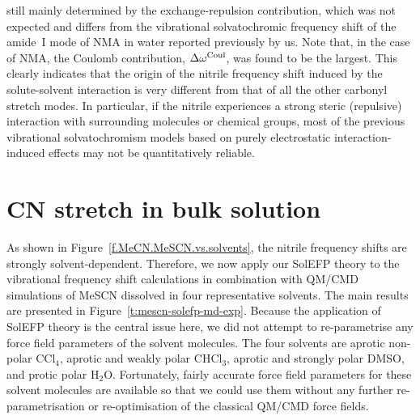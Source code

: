 \documentclass[a4paper,titlepage,twoside,fleqn,12pt]{book}
\begin{document}
\begin{refsection}
still mainly determined by the exchange\hyp{}repulsion
contribution, which was not expected and differs from the
vibrational solvatochromic frequency shift of the amide~I mode
of NMA in water reported previously by us. \citep{Blasiak.Cho.JCP.2014,Blasiak.Cho.JCP.2015} 
Note that, in
the case of NMA, the Coulomb contribution, $\Delta\omega^{\rm Coul}$, was found
to be the largest. This clearly indicates that the origin of the
nitrile frequency shift induced by the solute\hyp{}solvent
interaction is very different from that of all the other carbonyl
stretch modes. In particular, if the nitrile experiences a strong
steric (repulsive) interaction with surrounding molecules or
chemical groups, most of the previous vibrational
solvatochromism models based on purely electrostatic
interaction\hyp{}induced effects may not be quantitatively reliable.



\section{CN stretch in bulk solution\label{s:dw-cn-bulk}}

As shown in Figure~\ref{f.MeCN.MeSCN.vs.solvents}, 
the nitrile frequency shifts are strongly
solvent\hyp{}dependent. Therefore, we now apply our SolEFP
theory to the vibrational frequency shift calculations in
combination with QM/CMD simulations of MeSCN dissolved in four
representative solvents. The main results are presented in
Figure~\ref{t:mescn-solefp-md-exp}. Because the application of SolEFP 
theory is the central
issue here, we did not attempt to re\hyp{}parametrise any force
field parameters of the solvent molecules. The four solvents
are aprotic non\hyp{}polar CCl$_4$, aprotic and weakly polar CHCl$_3$,
aprotic and strongly polar DMSO, and protic polar H$_2$O.
Fortunately, fairly accurate force field parameters for these
solvent molecules are available so that we could use them
without any further re\hyp{}parametrisation or re\hyp{}optimisation of
the classical QM/CMD force fields.


\end{refsection}
\end{document}
